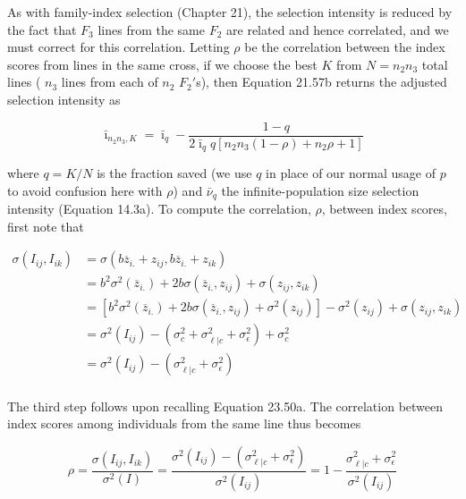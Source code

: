 \documentclass{article}
\begin{document}
As with family-index selection (Chapter 21), the selection intensity is reduced by the fact that  $ F_3 $ lines from the same  $ F_2 $ are related and hence correlated, and we must correct for this correlation. Letting  $ \rho $ be the correlation between the index scores from lines in the same cross, if we choose the best  $ K $ from  $ N = n_2 n_3 $ total lines ( $ n_3 $ lines from each of  $ n_2 $  $ F_2' $s), then Equation 21.57b returns the adjusted selection intensity as

\begin{equation}
\bar{\imath}_{n_{2}n_{3},K}=\bar{\imath}_{q}-\frac{1-q}{2\bar{\imath}_{q}q\left[n_{2}n_{3}(1-\rho)+n_{2}\rho+1\right]}
\tag{23.53}
\label{eq:23_53}
\end{equation}

where $q = K/N$ is the fraction saved (we use $q$ in place of our normal usage of $p$ to avoid confusion here with $\rho$) and $\bar{\nu}_q$ the infinite-population size selection intensity (Equation 14.3a). To compute the correlation, $\rho$, between index scores, first note that

\begin{equation}
\begin{aligned}\sigma(I_{ij},I_{ik})&=\sigma\left(b\overline{z}_{i.}+z_{ij},b\overline{z}_{i.}+z_{ik}\right)\\&=b^{2}\sigma^{2}(\overline{z}_{i.})+2b\sigma(\overline{z}_{i.},z_{ij})+\sigma(z_{ij},z_{ik})\\&=\left[b^{2}\sigma^{2}(\overline{z}_{i.})+2b\sigma(\overline{z}_{i.},z_{ij})+\sigma^{2}(z_{ij})\right]-\sigma^{2}(z_{ij})+\sigma(z_{ij},z_{ik})\\&=\sigma^{2}(I_{ij})-\left(\sigma_{c}^{2}+\sigma_{\ell|c}^{2}+\sigma_{\epsilon}^{2}\right)+\sigma_{c}^{2}\\&=\sigma^{2}(I_{ij})-\left(\sigma_{\ell|c}^{2}+\sigma_{\epsilon}^{2}\right)\\ \end{aligned}
\tag{23.54a}
\label{eq:23_54a}
\end{equation}

The third step follows upon recalling Equation 23.50a. The correlation between index scores among individuals from the same line thus becomes

\begin{equation}
\rho=\frac{\sigma(I_{ij},I_{ik})}{\sigma^{2}(I)}=\frac{\sigma^{2}(I_{ij})-\left(\sigma_{\ell|c}^{2}+\sigma_{\epsilon}^{2}\right)}{\sigma^{2}(I_{ij})}=1-\frac{\sigma_{\ell|c}^{2}+\sigma_{\epsilon}^{2}}{\sigma^{2}(I_{ij})}
\tag{23.54b}
\label{eq:23_54b}
\end{equation}
\end{document}
